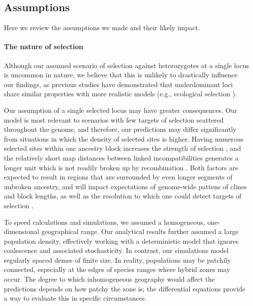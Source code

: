 \documentclass[11pt,letterpaper]{article}
\begin{document}
\subsection*{Assumptions}

Here we review the assumptions we made and their likely impact.

\paragraph{The nature of selection}
Although our assumed scenario of selection against heterozygotes at a single locus is uncommon in nature, we believe that this is unlikely to drastically influence our findings, as previous studies have demonstrated that underdominant loci share similar properties with more realistic models (e.g., ecological selection \citep{Barton1989,Barton1993}). 

Our assumption of a single selected locus may have greater consequences. Our model is most relevant to scenarios with few targets of selection scattered throughout the genome, and therefore, our predictions may differ significantly from situations in which the density of selected sites is higher. 
Having numerous selected sites within one ancestry block increases the strength of selection \citep{barton1986barrier}, 
and the relatively short map distances between linked incompatibilities generates a longer unit which is not readily broken up by recombination \citep{barton1986effects}. 
Both factors are expected to result in regions that are surrounded by even longer segments of unbroken ancestry, and will impact expectations of genome-wide pattens of clines and block lengths, as well as the resolution to which one could detect targets of selection \citep{Slatkin1975b,Barton1983}. 
 

To speed calculations and simulations, we assumed a homogeneous, one-dimensional geographical range.
Our analytical results further assumed a large population density, 
effectively working with a deterministic model that ignores coalescence and associated stochasticity.
In contrast, our simulations model regularly spaced demes of finite size.
In reality, populations may be patchily connected, especially at the edges of species ranges where hybrid zones may occur. 
The degree to which inhomogeneous geography would affect the predictions depends on how patchy the zone is;
the differential equations provide a way to evaluate this in specific circumstances.
\end{document}
